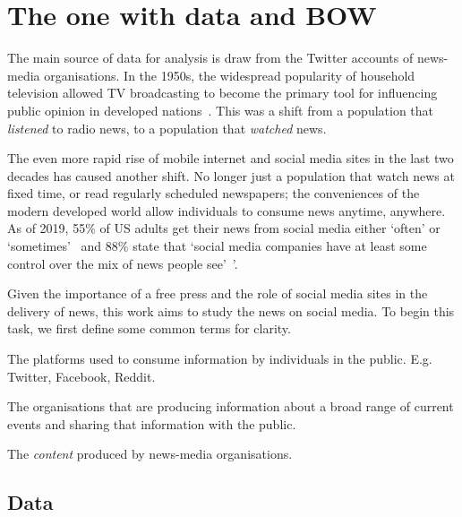 \chapter{The one with data and BOW\label{ch:dataandBOW}}

The main source of data for analysis is draw from the Twitter accounts of news-media organisations. In the 1950s, the widespread popularity of household television allowed TV broadcasting to become the primary tool for influencing public opinion in developed nations~.  This was a shift from a population that \emph{listened} to radio news, to a population that \emph{watched} news. 

The even more rapid rise of mobile internet and social media sites in the last two decades has caused another shift. No longer just a population that watch news at fixed time, or read regularly scheduled newspapers; the conveniences of the modern developed world allow individuals to consume news anytime, anywhere. As of 2019, 55\% of US adults get their news from social media either `often' or `sometimes'~ and 88\% state that `social media companies have at least some control over the mix of news people see'~'\cite{shearerAmericansAreWary2019}.

Given the importance of a free press and the role of social media sites in the delivery of news, this work aims to study the news on social media. To begin this task, we first define some common terms for clarity.

\begin{definition}
	The platforms used to consume information by individuals in the public. E.g. Twitter, Facebook, Reddit.
\end{definition}

\begin{definition}
	The organisations that are producing information about a broad range of current events and sharing that information with the public.
\end{definition}

\begin{definition}[News]
	The \emph{content} produced by news-media organisations. 
\end{definition}

\section{Data}


